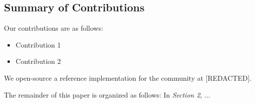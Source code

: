 
\subsection{Summary of Contributions}
\label{contributionsummary}

Our contributions are as follows:

\begin{itemize}
\item
  Contribution 1

\item
  Contribution 2

\end{itemize}





We open-source a reference implementation for the community at [REDACTED].

The remainder of this paper is organized as follows: In \textit{Section 2}, ...


